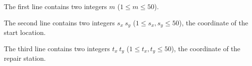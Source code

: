The first line contains two integers $m$ ($1\le m \le 50$).

The second line contains two integers $s_x\ s_y$ ($1 \le s_x, s_y \le 50$), the coordinate of the start location.

The third line contains two integers $t_x\ t_y$ ($1 \le t_x, t_y \le 50$), the coordinate of the repair station.
